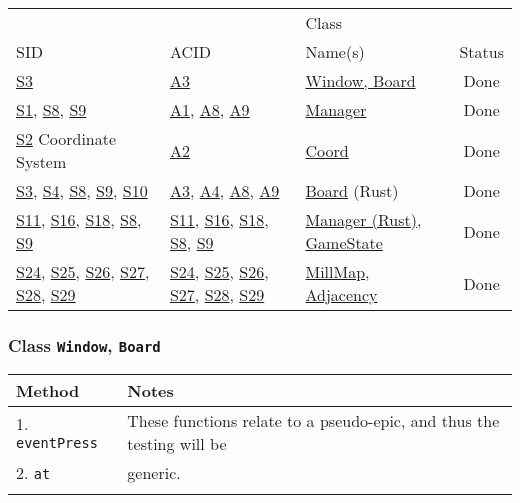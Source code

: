 \documentclass[11pt]{article}
\begin{document}
\begin{center}
\begin{tabular}{|p{3.0cm}|p{4.0cm}|p{5.0cm}|c|}
 &  & Class & \\
SID & ACID & Name(s) & Status\\
\hline
\hyperref[sec:orgb298c6a]{S3} & \hyperref[sec:org9708937]{A3} & \hyperref[sec:orgb7f2e5d]{Window, Board} & Done\\
\hline
\hyperref[sec:org2940434]{S1}, \hyperref[sec:orga007189]{S8}, \hyperref[sec:org48981c8]{S9} & \hyperref[sec:org5423200]{A1}, \hyperref[sec:org718948d]{A8}, \hyperref[sec:org34cd17b]{A9} & \hyperref[sec:org72c7423]{Manager} & Done\\
\hline
\hyperref[sec:org7807149]{S2} Coordinate System & \hyperref[sec:org615889e]{A2} & \hyperref[sec:orgd8c2aa0]{Coord} & Done\\
\hline
\hyperref[sec:orgb298c6a]{S3}, \hyperref[sec:orgebcc56a]{S4}, \hyperref[sec:orga007189]{S8}, \hyperref[sec:org48981c8]{S9}, \hyperref[sec:orge12bdd0]{S10} & \hyperref[sec:org9708937]{A3}, \hyperref[sec:org1e77c13]{A4}, \hyperref[sec:org718948d]{A8}, \hyperref[sec:org34cd17b]{A9} & \hyperref[sec:org6e880aa]{Board} (Rust) & Done\\
\hline
\hyperref[sec:org60852b8]{S11}, \hyperref[sec:orgeab77bb]{S16}, \hyperref[sec:orgf90a935]{S18}, \hyperref[sec:orga007189]{S8},  \hyperref[sec:org48981c8]{S9} & \hyperref[sec:org7d3a42e]{S11}, \hyperref[sec:org373589c]{S16}, \hyperref[sec:orgb83108f]{S18}, \hyperref[sec:org718948d]{S8},  \hyperref[sec:org34cd17b]{S9} & \hyperref[sec:org6686cf5]{Manager (Rust)}, \hyperref[sec:org5e39a77]{GameState} & Done\\
\hline
\hyperref[sec:org7f9a07f]{S24}, \hyperref[sec:org5cd5738]{S25}, \hyperref[sec:orgca7949c]{S26},  \hyperref[sec:orga31eb98]{S27}, \hyperref[sec:org589ee2d]{S28},  \hyperref[sec:org4e32353]{S29} & \hyperref[sec:orga442703]{S24},  \hyperref[sec:org67d882b]{S25}, \hyperref[sec:org3fd669d]{S26}, \hyperref[sec:org2018ffd]{S27}, \hyperref[sec:orgdd66f50]{S28}, \hyperref[sec:org1bb595a]{S29} & \hyperref[sec:orge9727c3]{MillMap}, \hyperref[sec:org800520f]{Adjacency} & Done\\
\end{tabular}
\end{center}


\subsubsection{Class \texttt{Window}, \texttt{Board}}
\label{sec:orgb7f2e5d}
\begin{center}
\begin{tabular}{|l|l|}
Method & Notes\\
\hline
1. \texttt{eventPress} & These functions relate to a pseudo-epic, and thus the testing will be\\
2. \texttt{at} & generic.\\
 & \\
\end{tabular}
\end{center}
\end{document}
